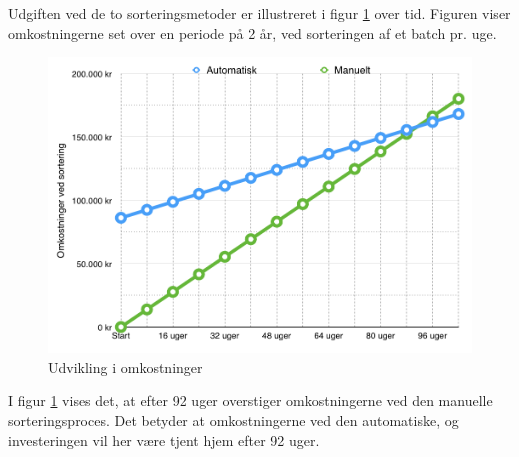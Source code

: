 \newpage
Udgiften ved de to sorteringsmetoder er illustreret i figur \ref{fig:costbenefit} over tid. Figuren viser omkostningerne set over en periode på 2 år, ved sorteringen af et batch pr. uge.

\begin{figure}[H]
	\centering
	\includegraphics[width=1\textwidth]{billeder/Hovedrapport/costbenefit2.png}
	\caption{Udvikling i omkostninger }
	\label{fig:costbenefit}
\end{figure}

I figur \ref{fig:costbenefit} vises det, at efter 92 uger overstiger omkostningerne ved den manuelle sorteringsproces.  Det betyder at omkostningerne ved den automatiske, og investeringen vil her være tjent hjem efter 92 uger. 